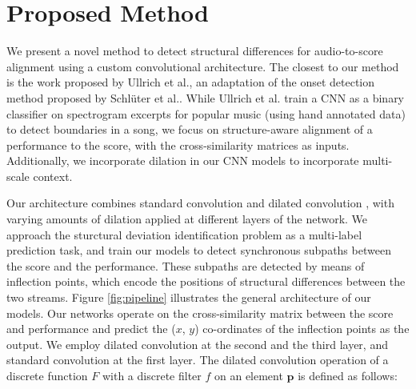\documentclass{article}
\begin{document}
\section{Proposed
Method}\label{method}
\vspace{-0.2cm}
We present a novel method to detect structural differences for audio-to-score alignment using a custom convolutional architecture.  The closest to our method is the work proposed by  Ullrich et al.\cite{ullrich2014boundary}, an adaptation of the onset detection method proposed by Schl{\"u}ter et al.\cite{schluter2014improved}.
While Ullrich et al.\cite{ullrich2014boundary} train a CNN as a binary classifier on spectrogram excerpts for popular music (using hand annotated data) to detect boundaries in a song, we focus on structure-aware alignment of a performance to the score, with the cross-similarity matrices as inputs. Additionally, we incorporate dilation in our CNN models to incorporate multi-scale context. 
\par Our architecture combines standard convolution and dilated convolution \cite{yu2015multi}, with varying amounts of dilation applied at different layers of the network. 
We approach the sturctural deviation identification problem as a multi-label prediction task, and train our models to detect synchronous subpaths between the score and the performance. These subpaths are detected by means of inflection points, which encode the positions of structural differences between the two streams. 
Figure \ref{fig:pipeline} illustrates the general architecture of our models. Our networks operate on the cross-similarity matrix between the score and performance and predict the ($x$, $y$) co-ordinates of the inflection points as the output.
We employ dilated convolution at the second and the third layer, and standard convolution at the first layer.
The dilated convolution operation \cite{yu2015multi} of a discrete function $F$ with a discrete filter $f$ on an element $\textbf{p}$ is defined as follows:
\vspace{-0.1cm}
\begin{comment}
\begin{equation}
(F*_df)(\textbf{p}) = \sum\limits_{s+dt=\textbf{p}}F(\textbf{s})f(\textbf{t})
\end{equation}
\end{comment}
\end{document}
